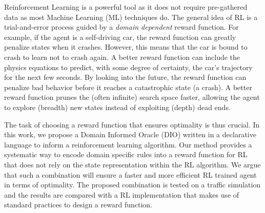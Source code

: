 \documentclass[a4paper,11pt]{article}
\theoremstyle{definition}
\begin{document}
\medskip

Reinforcement Learning is a powerful tool as it does not require
pre-gathered data as most Machine Learning (ML) techniques do. 
%
The general idea of RL is a trial-and-error process guided by a
\textit{domain dependent} reward function.
%
For example, if the agent is a self-driving car, the reward function
can greatly penalize states when it crashes.
%
However, this means that the car is bound to crash to learn not to
crash again.
%
A better reward function can include the physics equations to predict,
with some degree of certainty, the car's trajectory for the next few
seconds.
%
By looking into the future, the reward function can penalize bad
behavior before it reaches a catastrophic state (a crash).
%
A better reward function prunes the (often infinite) search space
faster, allowing the agent to explore (breadth) new states instead of
exploiting (depth) dead ends.
%

\medskip

The task of choosing a reward function that ensures optimality is thus
crucial. 
%
In this work, we propose a Domain Informed Oracle (DIO) written in a
declarative language to inform a reinforcement learning algorithm. 
%
Our method provides a systematic way to encode domain specific rules
into a reward function for RL that does not rely on the state
representation within the RL algorithm.
%
We argue that such a combination will ensure a faster and more
efficient RL trained agent in terms of optimality. 
%
The proposed combination is tested on a traffic simulation and the
results are compared with a RL implementation that makes use of
standard practices to design a reward function. 





\end{document}
